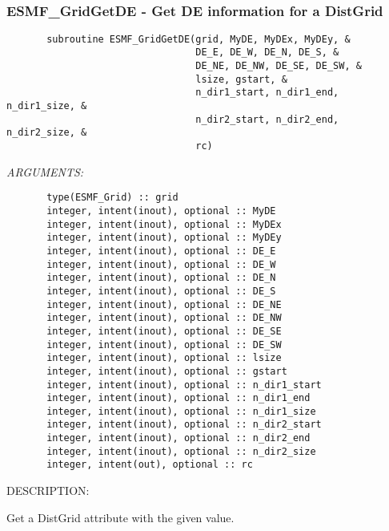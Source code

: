  
\mbox{}\hrulefill\ 
 
\subsubsection{ESMF\_GridGetDE - Get DE information for a DistGrid}


 
\begin{verbatim}       subroutine ESMF_GridGetDE(grid, MyDE, MyDEx, MyDEy, &
                                 DE_E, DE_W, DE_N, DE_S, &
                                 DE_NE, DE_NW, DE_SE, DE_SW, &
                                 lsize, gstart, &
                                 n_dir1_start, n_dir1_end, n_dir1_size, &
                                 n_dir2_start, n_dir2_end, n_dir2_size, &
                                 rc)\end{verbatim}{\em ARGUMENTS:}
\begin{verbatim}       type(ESMF_Grid) :: grid
       integer, intent(inout), optional :: MyDE
       integer, intent(inout), optional :: MyDEx
       integer, intent(inout), optional :: MyDEy
       integer, intent(inout), optional :: DE_E
       integer, intent(inout), optional :: DE_W
       integer, intent(inout), optional :: DE_N
       integer, intent(inout), optional :: DE_S
       integer, intent(inout), optional :: DE_NE
       integer, intent(inout), optional :: DE_NW
       integer, intent(inout), optional :: DE_SE
       integer, intent(inout), optional :: DE_SW
       integer, intent(inout), optional :: lsize
       integer, intent(inout), optional :: gstart
       integer, intent(inout), optional :: n_dir1_start
       integer, intent(inout), optional :: n_dir1_end
       integer, intent(inout), optional :: n_dir1_size
       integer, intent(inout), optional :: n_dir2_start
       integer, intent(inout), optional :: n_dir2_end
       integer, intent(inout), optional :: n_dir2_size
       integer, intent(out), optional :: rc
 \end{verbatim}
{\sf DESCRIPTION:\\ }


       Get a DistGrid attribute with the given value.
  
